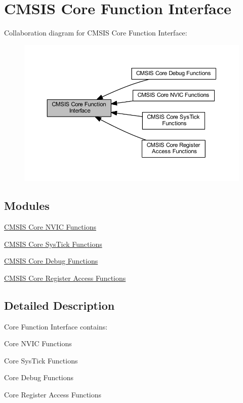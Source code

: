 \hypertarget{group___c_m_s_i_s___core___function_interface}{}\section{C\+M\+S\+IS Core Function Interface}
\label{group___c_m_s_i_s___core___function_interface}
Collaboration diagram for C\+M\+S\+IS Core Function Interface\+:\nopagebreak
\begin{figure}[H]
\begin{center}
\leavevmode
\includegraphics[width=350pt]{group___c_m_s_i_s___core___function_interface}
\end{center}
\end{figure}
\subsection*{Modules}
\begin{DoxyCompactItemize}
\item 
\hyperlink{group___c_m_s_i_s___core___n_v_i_c_functions}{C\+M\+S\+I\+S Core N\+V\+I\+C Functions}
\item 
\hyperlink{group___c_m_s_i_s___core___sys_tick_functions}{C\+M\+S\+I\+S Core Sys\+Tick Functions}
\item 
\hyperlink{group___c_m_s_i_s__core___debug_functions}{C\+M\+S\+I\+S Core Debug Functions}
\item 
\hyperlink{group___c_m_s_i_s___core___reg_acc_functions}{C\+M\+S\+I\+S Core Register Access Functions}
\end{DoxyCompactItemize}


\subsection{Detailed Description}
Core Function Interface contains\+:
\begin{DoxyItemize}
\item Core N\+V\+IC Functions
\item Core Sys\+Tick Functions
\item Core Debug Functions
\item Core Register Access Functions 
\end{DoxyItemize}